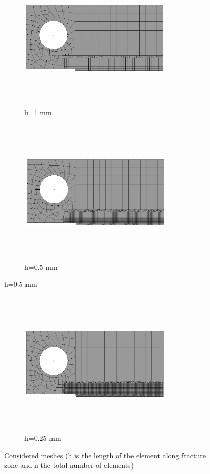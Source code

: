 \documentclass[12pt,twoside]{report}
\begin{document}
\begin{figure}[htbp!]
      \begin{subfigure}{0.35\textwidth}
          \includegraphics[width=7.25cm,height=7cm,keepaspectratio]{26.h=1mm.png}
         \caption{h=1 mm}
         \label{fig:1mm}
     \end{subfigure}
    \hspace{3cm}
     \begin{subfigure}{0.35\textwidth}
         \includegraphics[width=7.3cm,height=7cm,keepaspectratio]{26.h=0.5mm.png}
         \caption{h=0.5 mm}
         \label{fig:0.5mm}
     \end{subfigure}
\end{figure}
\FloatBarrier
\begin{figure}[htbp!]\ContinuedFloat
     \centering
     \begin{subfigure}{0.35\textwidth}
         \includegraphics[width=7.3cm,height=7cm,keepaspectratio]{26.h=0.25mm.png}
         \caption{h=0.25 mm}
         \label{fig:0.25mm}
     \end{subfigure}
    \caption{Considered meshes (h is the length of the element along fracture zone and n the total number of elements) }
    \label{fig:Considered meshes 2}
\end{figure}
\end{document}
